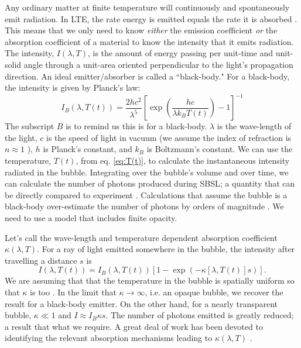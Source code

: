 \documentclass[11pt,prb,aps,nofootinbib,superscriptaddress,floatfix]{revtex4-2}
\begin{document}
Any ordinary matter at finite temperature will continuously and spontaneously emit radiation. In LTE, the rate energy is emitted equals the rate it is absorbed \cite{zel2002physics}. This means that we only need to know \emph{either} the emission coefficient \emph{or} the absorption coefficient of a material to know the intensity that it emits radiation. The intensity, $I(\lambda,T)$, is the amount of energy passing per unit-time and unit-solid angle through a unit-area oriented perpendicular to the light's propagation direction. An ideal emitter/absorber is called a ``black-body."  For a black-body, the intensity is given by Planck's law: \cite{schroeder1999introduction}
\begin{equation}
    I_{B}(\lambda,T(t))=\frac{2 h c^2}{\lambda^5}\left[\exp\left(\frac{hc}{\lambda k_B T(t)}\right)-1\right]^{-1}
\end{equation}
The subscript $B$ is to remind us this is for a black-body. $\lambda$ is the wave-length of the light, $c$ is the speed of light in vacuum (we assume the index of refraction is $n\approx 1$ \cite{hilgenfeldt1999simple,hilgenfeldt1999sonoluminescence,zel2002physics}), $h$ is Planck's constant, and $k_B$ is Boltzmann's constant. We can use the temperature, $T(t)$, from eq. \ref{eq:T(t)}, to calculate the instantaneous intensity radiated in the bubble. Integrating over the bubble's volume and over time, we can calculate the number of photons produced during SBSL; a quantity that can be directly compared to experiment \cite{hilgenfeldt1999simple,hilgenfeldt1999sonoluminescence,an2006mechanism,an2008spectral,an2009diagnosing}. Calculations that assume the bubble is a black-body over-estimate the number of photons by orders of magnitude \cite{hilgenfeldt1999simple,brenner2002single}. We need to use a model that includes finite opacity.

Let's call the wave-length and temperature dependent absorption coefficient $\kappa(\lambda,T)$. For a ray of light emitted somewhere in the bubble, the intensity after travelling a distance $s$ is \cite{zel2002physics,hilgenfeldt1999simple,taylor1969experimental}
\begin{equation}
    I(\lambda,T(t))=I_{B}(\lambda,T(t))  \left[ 1-\exp \left( -\kappa[\lambda,T(t)] s \right) \right].
    \label{eq:intensity}
\end{equation}
We are assuming that that the temperature in the bubble is spatially uniform so that $\kappa$ is too \cite{hilgenfeldt1999sonoluminescence,hilgenfeldt1999simple}. In the limit that $\kappa \rightarrow\infty$, i.e. an opaque bubble, we recover the result for a black-body emitter. On the other hand, for a nearly transparent bubble, $\kappa \ll 1$ and $I\approx I_B \kappa s$. The number of photons emitted is greatly reduced; a result that what we require. A great deal of work has been devoted to identifying the relevant absorption mechanisms leading to $\kappa(\lambda,T)$ \cite{hilgenfeldt1999simple,brenner2002single,hilgenfeldt1999sonoluminescence,yasui1999mechanism,flannigan2005plasma,flannigan2005plasma1,flannigan2006measurement,suslick2008inside,an2009diagnosing,an2008spectral,an2006mechanism}. 
\end{document}
